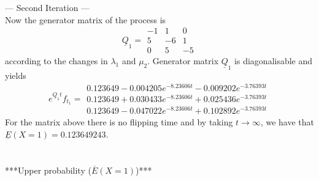 \documentclass{article}
\begin{document}
--- Second Iteration ---\\
Now the generator matrix of the process is
\begin{equation*} 
 \underline{Q}_{1}= 
 \begin{array}{|rrr|}
  -1 & 1 & 0 \\
  5 & -6 & 1 \\
  0 & 5 & -5 
 \end{array}
 \end{equation*}
according to the changes in $\lambda_{1}$ and $\mu_{2}$.
Generator matrix $\underline{Q}_1$ is diagonalisable and yields 
\begin{equation*} 
 e^{\underline{Q}_{1}t}f_{t_1}= 
 \begin{array}{|r|}
 0.123649-0.004205e^{-8.23606t}-0.009202e^{-3.76393t}\\
 0.123649+0.030433e^{-8.23606t}+0.025436e^{-3.76393t}\\
 0.123649-0.047022e^{-8.23606t}+0.102892e^{-3.76393t}
 \end{array}
 \end{equation*}
For the matrix above there is no flipping time and by taking $t\to\infty$, we have that
$\underline{E}(X=1) = 0.123649243$.\\\\\\


***Upper probability ($\overline{E}(X=1)$)***\\
\end{document}
